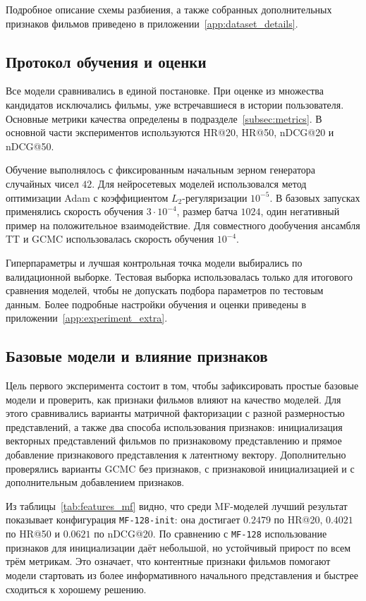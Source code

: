 \documentclass[12pt,fleqn]{article}
\begin{document}
Подробное описание схемы разбиения, а также собранных дополнительных признаков
фильмов приведено в приложении~\ref{app:dataset_details}.

\subsection{Протокол обучения и оценки}
\label{subsec:experiment_protocol}

Все модели сравнивались в единой постановке. При оценке
из множества кандидатов исключались фильмы, уже встречавшиеся в истории
пользователя. Основные метрики качества определены в
подразделе~\ref{subsec:metrics}. В основной части экспериментов используются
HR@20, HR@50, nDCG@20 и nDCG@50.

Обучение выполнялось с фиксированным начальным зерном генератора случайных чисел $42$. Для нейросетевых
моделей использовался метод оптимизации Adam с коэффициентом $L_2$-регуляризации $10^{-5}$. В базовых запусках
применялись скорость обучения $3\cdot 10^{-4}$, размер батча $1024$, один негативный
пример на положительное взаимодействие. Для совместного дообучения ансамбля TT и GCMC использовалась
скорость обучения $10^{-4}$.

Гиперпараметры и лучшая контрольная точка модели выбирались по валидационной выборке.
Тестовая выборка использовалась только для итогового сравнения моделей, чтобы
не допускать подбора параметров по тестовым данным. Более подробные настройки
обучения и оценки приведены в приложении~\ref{app:experiment_extra}.

\subsection{Базовые модели и влияние признаков}
\label{subsec:experiment_features}

Цель первого эксперимента состоит в том, чтобы зафиксировать простые
базовые модели и проверить, как признаки фильмов влияют на качество моделей. Для
этого сравнивались варианты матричной факторизации с разной размерностью
представлений, а также два способа использования признаков: инициализация
векторных представлений фильмов по признаковому представлению и прямое добавление
признакового представления к латентному вектору. Дополнительно проверялись
варианты GCMC без признаков, с признаковой инициализацией и с дополнительным
добавлением признаков.



Из таблицы~\ref{tab:features_mf} видно, что среди MF-моделей лучший результат
показывает конфигурация \texttt{MF-128-init}: она достигает $0.2479$ по
HR@20, $0.4021$ по HR@50 и $0.0621$ по nDCG@20. По сравнению с
\texttt{MF-128} использование признаков для инициализации даёт небольшой, но
устойчивый прирост по всем трём метрикам. Это означает, что контентные
признаки фильмов помогают модели стартовать из более информативного начального
представления и быстрее сходиться к хорошему решению.
\end{document}

